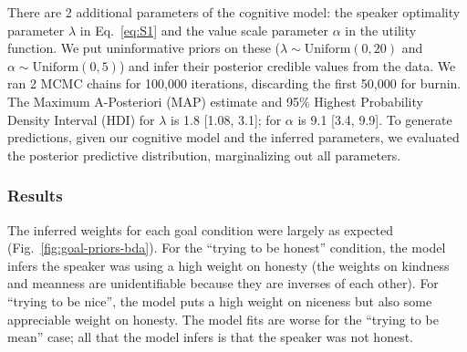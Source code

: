 \documentclass[10pt,letterpaper]{article}
\newcommand{\red}[1]{\textcolor{Red}{#1}}
\newcommand{\ndg}[1]{\textcolor{Green}{[ndg: #1]}}
\newcommand{\mht}[1]{\textcolor{DarkOrange}{[mht: #1]}}
\begin{document}
There are 2 additional parameters of the cognitive model: the speaker optimality parameter $\lambda$ in Eq.~\ref{eq:S1} and the value scale parameter $\alpha$ in the utility function.
We put uninformative priors on these ($\lambda \sim \text{Uniform}(0,20)$ and $\alpha \sim \text{Uniform}(0, 5)$) and infer their posterior credible values from the data.
We ran 2 MCMC chains for 100,000 iterations, discarding the first 50,000 for burnin.
The Maximum A-Posteriori (MAP) estimate and 95\% Highest Probability Density Interval (HDI) for $\lambda$ is 1.8 [1.08, 3.1]; for $\alpha$ is 9.1 [3.4, 9.9]. %
To generate predictions, given our cognitive model and the inferred parameters, we evaluated the posterior predictive distribution, marginalizing out all parameters.



%




\subsubsection{Results}

The inferred weights for each goal condition were largely as expected (Fig.~\ref{fig:goal-priors-bda}).
For the ``trying to be honest'' condition, the model infers the speaker was using a high weight on honesty (the weights on kindness and meanness are unidentifiable because they are inverses of each other).
For ``trying to be nice'', the model puts a high weight on niceness but also some appreciable weight on honesty.
The model fits are worse for the ``trying to be mean'' case; all that the model infers is that the speaker was not honest.
\end{document}
